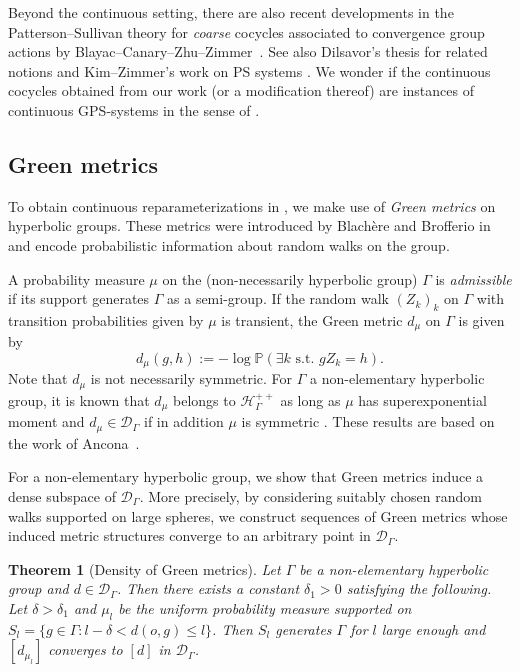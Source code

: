 \documentclass[twoside]{amsart}
\newtheorem{mainthm}{Theorem}
\theoremstyle{definition}
\numberwithin{equation}{section}
\numberwithin{theorem}{section}
\newcommand{\bbP}{\mathbb{P}}
\newcommand{\calD}{\mathcal{D}}
\newcommand{\calH}{\mathcal{H}}
\newcommand{\scrD}{\mathscr{D}}
\newcommand{\G}{\Gamma}
\newcommand{\del}{\delta}
\begin{document}
Beyond the continuous setting, there are also recent developments in the Patterson--Sullivan theory for \emph{coarse} cocycles associated to convergence group actions by Blayac--Canary--Zhu--Zimmer~\cite{BCZZ24:GPS1,BCZZ24:GPS2}. See also Dilsavor's thesis \cite{dilsavor} for related notions and Kim--Zimmer's work on PS systems \cite{KZ25:Rigidity}.  We wonder if the continuous cocycles obtained from our work (or a modification thereof) are instances of continuous GPS-systems in the sense of \cite{BCZZ24:GPS2}.




\subsection{Green metrics}\label{subsec:introGreen}
To obtain continuous reparameterizations in , we make use of \emph{Green metrics} on hyperbolic groups. These metrics were introduced by Blach\`ere and Brofferio in \cite{blachere-brofferio} and encode probabilistic information about random walks on the group. 

A probability measure $\mu$ on the (non-necessarily hyperbolic group) $\G$ is \emph{admissible} if its support generates $\G$ as a semi-group. If the random walk $(Z_k)_k$ on $\G$ with transition probabilities given by $\mu$ is transient, the Green metric $d_{\mu}$ on $\G$ is given by
\[d_\mu(g, h) := -\log \bbP(\exists k \text{ s.t. } gZ_k = h).\]
Note that $d_\mu$ is not necessarily symmetric. For $\G$ a non-elementary hyperbolic group, it is known that $d_\mu$ belongs to $\calH_\G^{++}$ as long as $\mu$ has superexponential moment and $d_\mu\in \calD_\G$ if in addition $\mu$ is symmetric \cite{BHM.harmonic,gouezel,GGPY}. These results are based on the work of Ancona~\cite{Anc87:InequalityAncona}.

For a non-elementary hyperbolic group, we show that Green metrics induce a dense subspace of $\scrD_\G$. More precisely, by considering suitably chosen random walks supported on large spheres, we construct sequences of Green metrics whose induced metric structures converge to an arbitrary point in $\scrD_\G$.

\begin{mainthm}[Density of Green metrics]\label{mainthm.greendense}
    Let $\G$ be a non-elementary hyperbolic group and $d\in \calD_\G$. Then there exists a constant $\del_1>0$ satisfying the following. Let $\del>\del_1$ and $\mu_l$ be the uniform probability measure supported on $S_l=\{g\in \G \colon l-\del<d(o,g)\leq l\}$. Then $S_l$ generates $\G$ for $l$ large enough and $[d_{\mu_l}]$ converges to $[d]$ in $\scrD_\G$.
\end{mainthm}
\end{document}

